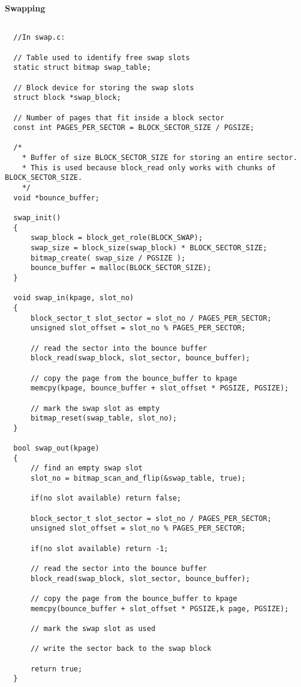 \textbf{Swapping}

\begin{lstlisting}
  
  //In swap.c:
  
  // Table used to identify free swap slots
  static struct bitmap swap_table;

  // Block device for storing the swap slots
  struct block *swap_block;

  // Number of pages that fit inside a block sector
  const int PAGES_PER_SECTOR = BLOCK_SECTOR_SIZE / PGSIZE;

  /*
    * Buffer of size BLOCK_SECTOR_SIZE for storing an entire sector.
    * This is used because block_read only works with chunks of BLOCK_SECTOR_SIZE.
    */
  void *bounce_buffer;

  swap_init()
  {
      swap_block = block_get_role(BLOCK_SWAP);
      swap_size = block_size(swap_block) * BLOCK_SECTOR_SIZE;
      bitmap_create( swap_size / PGSIZE );
      bounce_buffer = malloc(BLOCK_SECTOR_SIZE);
  }
  
  void swap_in(kpage, slot_no)
  {
      block_sector_t slot_sector = slot_no / PAGES_PER_SECTOR;
      unsigned slot_offset = slot_no % PAGES_PER_SECTOR;

      // read the sector into the bounce buffer
      block_read(swap_block, slot_sector, bounce_buffer);

      // copy the page from the bounce_buffer to kpage
      memcpy(kpage, bounce_buffer + slot_offset * PGSIZE, PGSIZE);

      // mark the swap slot as empty
      bitmap_reset(swap_table, slot_no);
  }
  
  bool swap_out(kpage)
  {
      // find an empty swap slot
      slot_no = bitmap_scan_and_flip(&swap_table, true);

      if(no slot available) return false;

      block_sector_t slot_sector = slot_no / PAGES_PER_SECTOR;
      unsigned slot_offset = slot_no % PAGES_PER_SECTOR;

      if(no slot available) return -1;

      // read the sector into the bounce buffer
      block_read(swap_block, slot_sector, bounce_buffer);

      // copy the page from the bounce_buffer to kpage
      memcpy(bounce_buffer + slot_offset * PGSIZE,k page, PGSIZE);

      // mark the swap slot as used

      // write the sector back to the swap block

      return true;
  }
	
\end{lstlisting}

